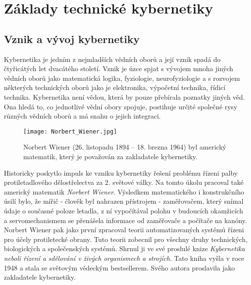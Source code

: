 {
\chapter{Základy technické kybernetiky}
\minitoc
  \section{Vznik a vývoj kybernetiky}
    Kybernetika je jedním z nejmladších vědních oborů a její vznik spadá do čtyřicátých let 
    dvacátého století. Vznik je úzce spjat s vývojem mnoha jiných vědních oborů jako matematická 
    logika, fyziologie, neurofyziologie a s rozvojem některých technických oborů jako je 
    elektronika, výpočetní technika, řídicí technika. Kybernetika není vědou, která by pouze 
    přebírala poznatky jiných věd. Ona hledá to, co jednotlivé vědní obory spojuje, postihuje 
    určité společné rysy různých vědních oborů a má snahu o jejich integraci. 

    \begin{figure}[ht!]
      \centering
      \texttt{[image: Norbert\_Wiener.jpg]}
      \caption{Norbert Wiener (26. listopadu 1894 – 18. brezna 1964) byl americký matematik, který 
               je považován za zakladatele kybernetiky. }
      \label{tky:fig003}
    \end{figure}
  
    Historicky poskytlo impuls ke vzniku kybernetiky řešení problému řízeni palby protiletadlového 
    dělostřelectva za 2. světové války. Na tomto úkolu pracoval také americký matematik 
    \emph{Norbert Wiener}. Výsledkem matematického i konstrukčního úsilí bylo, že mířič - člověk 
    byl nahrazen přístrojem - zaměřovačem, který snímal údaje o současné poloze letadla, z ní 
    vypočítával polohu v budoucích okamžicích a servomechanismem se přenášela informace od 
    zaměřovače a počítače na kanóny. Norbert Wiener pak jako první zpracoval teorii 
    automatizovaných systémů řízeni pro účely protiletecké obrany. Tuto teorii zobecnil pro všechny 
    druhy technických, biologických a společenských systémů. Shrnul ji ve své proslulé knize 
    \emph{Kybernetika neboli řízení a sdělování v živých organismech a strojích}. Tato kniha vyšla 
    v roce \num{1948} a stala se světovým vědeckým bestsellerem. Svého autora proslavila jako 
    zakladatele kybernetiky.
    
}
